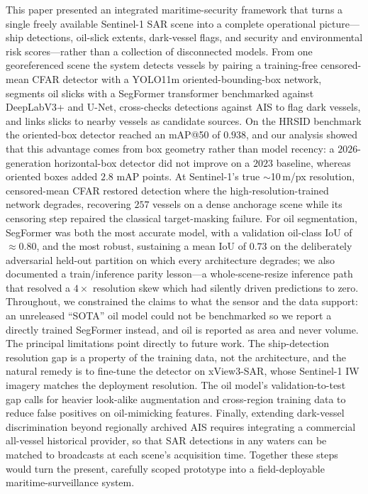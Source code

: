 \documentclass{ieeeaccess}
\begin{document}
This paper presented an integrated maritime-security framework that turns a single freely available Sentinel-1 SAR scene into a complete operational picture---ship detections, oil-slick extents, dark-vessel flags, and security and environmental risk scores---rather than a collection of disconnected models. From one georeferenced scene the system detects vessels by pairing a training-free censored-mean CFAR detector with a YOLO11m oriented-bounding-box network, segments oil slicks with a SegFormer transformer benchmarked against DeepLabV3+ and U-Net, cross-checks detections against AIS to flag dark vessels, and links slicks to nearby vessels as candidate sources. On the HRSID benchmark the oriented-box detector reached an mAP@50 of $0.938$, and our analysis showed that this advantage comes from box geometry rather than model recency: a $2026$-generation horizontal-box detector did not improve on a $2023$ baseline, whereas oriented boxes added $2.8$ mAP points. At Sentinel-1's true $\sim$10\,m/px resolution, censored-mean CFAR restored detection where the high-resolution-trained network degrades, recovering $257$ vessels on a dense anchorage scene while its censoring step repaired the classical target-masking failure. For oil segmentation, SegFormer was both the most accurate model, with a validation oil-class IoU of $\approx0.80$, and the most robust, sustaining a mean IoU of $0.73$ on the deliberately adversarial held-out partition on which every architecture degrades; we also documented a train/inference parity lesson---a whole-scene-resize inference path that resolved a $4\times$ resolution skew which had silently driven predictions to zero. Throughout, we constrained the claims to what the sensor and the data support: an unreleased ``SOTA'' oil model could not be benchmarked so we report a directly trained SegFormer instead, and oil is reported as area and never volume. The principal limitations point directly to future work. The ship-detection resolution gap is a property of the training data, not the architecture, and the natural remedy is to fine-tune the detector on xView3-SAR, whose Sentinel-1 IW imagery matches the deployment resolution. The oil model's validation-to-test gap calls for heavier look-alike augmentation and cross-region training data to reduce false positives on oil-mimicking features. Finally, extending dark-vessel discrimination beyond regionally archived AIS requires integrating a commercial all-vessel historical provider, so that SAR detections in any waters can be matched to broadcasts at each scene's acquisition time. Together these steps would turn the present, carefully scoped prototype into a field-deployable maritime-surveillance system.
\end{document}
